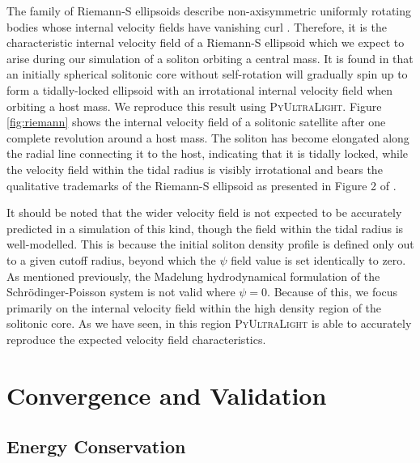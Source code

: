\documentclass[a4paper,11pt]{article}
\newcommand{\PyUltraLight}{\textsc{PyUltraLight}\xspace}
\begin{document}
The family of Riemann-S ellipsoids describe non-axisymmetric uniformly rotating bodies whose internal velocity fields have vanishing curl \cite{Chandrasekhar1965}. Therefore, it is the characteristic internal velocity field of a Riemann-S ellipsoid which we expect to arise during our simulation of a soliton orbiting a central mass. It is found in \cite{Du:2018zrg} that an initially spherical solitonic core without self-rotation will gradually spin up to form a tidally-locked ellipsoid with an irrotational internal velocity field when orbiting a host mass. We reproduce this result using \PyUltraLight. Figure \ref{fig:riemann} shows the internal velocity field of a solitonic satellite after one complete revolution around a host mass. The soliton has become elongated along the radial line connecting it to the host, indicating that it is tidally locked, while the velocity field within the tidal radius is visibly irrotational and bears the qualitative trademarks of the Riemann-S ellipsoid as presented in Figure 2 of \cite{RindlerDaller:2011kx}. 

It should be noted that the wider velocity field is not expected to be accurately predicted in a simulation of this kind, though the field within the tidal radius is well-modelled. This is because the initial soliton density profile is defined only out to a given cutoff radius, beyond which the $\psi$ field value is set identically to zero. As mentioned previously, the Madelung hydrodynamical formulation of the Schr{\"o}dinger-Poisson system is not valid where $\psi=0$. Because of this, we focus primarily on the internal velocity field within the high density region of the solitonic core. As we have seen, in this region \PyUltraLight is able to accurately reproduce the expected velocity field characteristics.

\section{Convergence  and Validation}
\subsection{Energy Conservation}\label{sec:energy}
\end{document}
